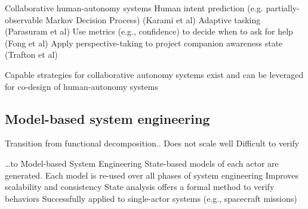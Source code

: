 Collaborative human-autonomy systems
Human intent prediction (e.g. partially-observable Markov Decision Process) (Karami et al)
Adaptive tasking (Parasuram et al)
Use metrics (e.g., confidence) to decide when to ask for help (Fong et al) 
Apply perspective-taking to project companion awareness state (Trafton et al)


Capable strategies for collaborative autonomy systems exist and can be 
leveraged for co-design of human-autonomy systems


\subsection*{Model-based system engineering}
Transition from functional decomposition..
Does not scale well
Difficult to verify


…to Model-based System Engineering 
State-based models of each actor are generated.
Each model is re-used over all phases of system engineering
Improves scalability and consistency
State analysis offers a formal method to verify behaviors
Successfully applied to single-actor systems (e.g., spacecraft missions)

